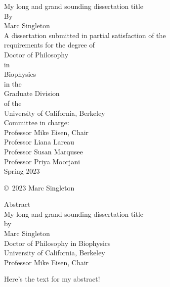 \documentclass[11pt,letterpaper,oneside]{book}
\begin{document}
\begin{titlepage}
\begin{center}
    My long and grand sounding dissertation title\\
    \bigskip
    By\\
    Marc Singleton\\
    \vfill
    A dissertation submitted in partial satisfaction of the\\
    requirements for the degree of\\
    Doctor of Philosophy\\
    in\\
    Biophysics\\
    in the\\
    Graduate Division\\
    of the\\
    University of California, Berkeley\\
    \vfill
    Committee in charge:\\
    Professor Mike Eisen, Chair\\
    Professor Liana Lareau\\
    Professor Susan Marqusee\\
    Professor Priya Moorjani\\
    \bigskip
    Spring 2023\\
\end{center}
\end{titlepage}

\thispagestyle{empty}
\null  %
\vfill
\begin{center}
    \copyright \  2023 Marc Singleton
\end{center}
\clearpage

\setcounter{page}{1}  %
\begin{center}
    Abstract\\
    \bigskip
    My long and grand sounding dissertation title\\
    by\\
    Marc Singleton\\
    \bigskip
    Doctor of Philosophy in Biophysics\\
    University of California, Berkeley\\
    Professor Mike Eisen, Chair\\
    \bigskip
\end{center}
Here's the text for my abstract!
\clearpage
\end{document}
